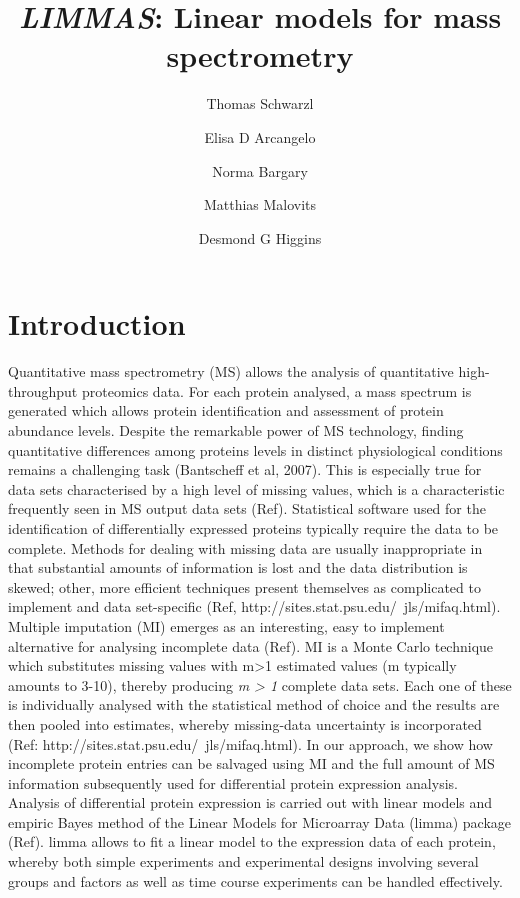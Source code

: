 \documentclass[a4paper,11pt]{article}
\newcommand{\Rpackage}[1]{\textit{#1}}
\begin{document}


\title{\Rpackage{LIMMAS}: Linear models for mass spectrometry}
\author[1]{Thomas Schwarzl}
\author[1]{Elisa D Arcangelo}
\author[1]{Norma Bargary}
\author[1]{Matthias Malovits}
\author[1]{Desmond G Higgins}




\maketitle
\tableofcontents

\section{Introduction}

Quantitative mass spectrometry (MS) allows the analysis of quantitative high-throughput proteomics data. For each 
protein analysed, a mass spectrum is generated which allows protein identification and assessment of protein abundance levels. Despite the remarkable power of MS technology, finding quantitative differences among proteins levels in distinct physiological conditions remains a challenging task (Bantscheff et al, 2007). This is especially true for data sets characterised by a high level of missing values, which is a characteristic frequently seen in MS output data sets (Ref). 
Statistical software used for the identification of differentially expressed proteins typically require the data to be complete.
Methods for dealing with missing data are usually inappropriate in that substantial amounts of information is lost and the data distribution is skewed; other, more efficient techniques present themselves as complicated to implement and data set-specific (Ref, http://sites.stat.psu.edu/~jls/mifaq.html). 
Multiple imputation (MI) emerges as an interesting, easy to implement alternative for analysing incomplete data (Ref). 
MI is a Monte Carlo technique which substitutes missing values with m>1 estimated values (m typically amounts to 3-10), thereby producing \emph{m > 1} complete data sets. Each one of these is individually analysed with the statistical method of 
choice and the results are then pooled into estimates, whereby missing-data uncertainty is incorporated (Ref: http://sites.stat.psu.edu/~jls/mifaq.html).
In our approach, we show how incomplete protein entries can be salvaged using MI and the full amount of MS information subsequently used for differential protein expression analysis. Analysis of differential protein expression is  carried out with linear models and empiric Bayes method of the Linear Models for Microarray Data (limma) package (Ref). limma allows to fit a linear model to the expression data of each protein, whereby both simple experiments and 
experimental designs involving several groups and factors as well as time course experiments can be handled effectively.
\end{document}

